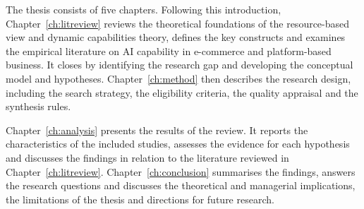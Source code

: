 The thesis consists of five chapters. Following this introduction, Chapter~\ref{ch:litreview} reviews the theoretical foundations of the resource-based view and dynamic capabilities theory, defines the key constructs and examines the empirical literature on AI capability in e-commerce and platform-based business. It closes by identifying the research gap and developing the conceptual model and hypotheses. Chapter~\ref{ch:method} then describes the research design, including the search strategy, the eligibility criteria, the quality appraisal and the synthesis rules.

Chapter~\ref{ch:analysis} presents the results of the review. It reports the characteristics of the included studies, assesses the evidence for each hypothesis and discusses the findings in relation to the literature reviewed in Chapter~\ref{ch:litreview}. Chapter~\ref{ch:conclusion} summarises the findings, answers the research questions and discusses the theoretical and managerial implications, the limitations of the thesis and directions for future research.
